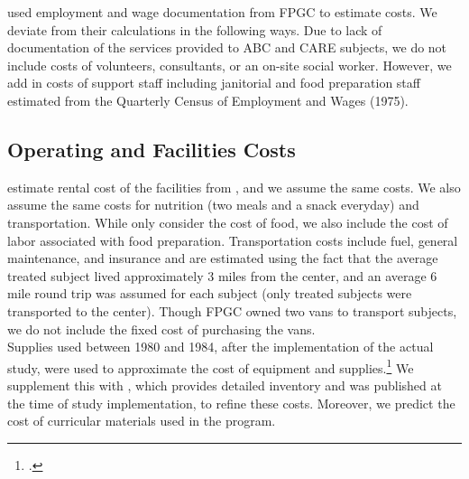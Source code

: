 \noindent \cite{Barnett_Masse_2002_benefitcost} used employment and wage documentation from FPGC to estimate costs. We deviate from their calculations in the following ways. Due to lack of documentation of the services provided to ABC and CARE subjects, we do not include costs of volunteers, consultants, or an on-site social worker. However, we add in costs of support staff including janitorial and food preparation staff estimated from the Quarterly Census of Employment and Wages (1975). \\

\subsection{Operating and Facilities Costs}

\noindent \cite{Barnett_Masse_2002_benefitcost} estimate rental cost of the facilities from \cite{Helburn_1995_Childcare-Report}, and we assume the same costs. We also assume the same costs for nutrition (two meals and a snack everyday) and transportation. While \cite{Barnett_Masse_2002_benefitcost} only consider the cost of food, we also include the cost of labor associated with food preparation. Transportation costs include fuel, general maintenance, and insurance and are estimated using the fact that the average treated subject lived approximately 3 miles from the center, and an average 6 mile round trip was assumed for each subject (only treated subjects were transported to the center). Though FPGC owned two vans to transport subjects, we do not include the fixed cost of purchasing the vans. \\

\noindent Supplies used between 1980 and 1984, after the implementation of the actual study, were used to approximate the cost of equipment and supplies.\footnote{\citet{Barnett_Masse_2002_benefitcost}.} We supplement this with \cite{FPGC_Progress-Report_1973}, which provides detailed inventory and was published at the time of study  implementation, to refine these costs. Moreover, we predict the cost of curricular materials used in the program. \\



